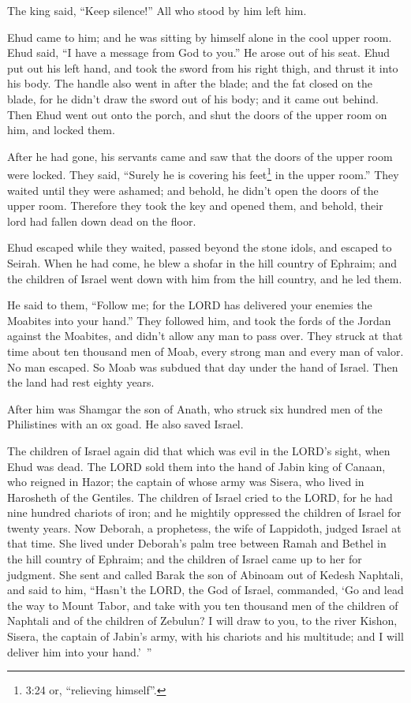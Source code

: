 The king said, “Keep silence!” All who stood by him left him.

\myverse{}Ehud came to him; and he was sitting by himself alone in the
cool upper room. Ehud said, “I have a message from God to you.” He arose out of his seat.
\myverse{}Ehud put out his left hand, and took the sword from his right thigh, and thrust
it into his body.
\myverse{}The handle also went in after the blade; and the fat closed on the blade,
for he didn’t draw the sword out of his body; and it came out behind.
\myverse{}Then Ehud went out onto the porch, and shut the doors of the upper room on
him, and locked them.

\myverse{}After he had gone, his servants came and saw that the doors of
the upper room were locked. They said, “Surely he is covering his feet\footnote{3:24 or, “relieving himself”.} in the upper room.”
\myverse{}They waited until they were ashamed; and behold, he didn’t open the doors
of the upper room. Therefore they took the key and opened them, and behold, their lord had fallen down
dead on the floor.

\myverse{}Ehud escaped while they waited, passed beyond the stone idols,
and escaped to Seirah.
\myverse{}When he had come, he blew a shofar in the hill country of Ephraim; and the
children of Israel went down with him from the hill country, and he led them.

\myverse{}He said to them, “Follow me; for the LORD has delivered your
enemies the Moabites into your hand.” They followed him, and took the fords of the Jordan against the
Moabites, and didn’t allow any man to pass over.
\myverse{}They struck at that time about ten thousand men of Moab, every strong man
and every man of valor. No man escaped.
\myverse{}So Moab was subdued that day under the hand of Israel. Then the land had rest
eighty years.

\myverse{}After him was Shamgar the son of Anath, who struck six hundred
men of the Philistines with an ox goad. He also saved Israel.


\mychapter{} \myverse*{}The children of Israel again did that which was evil in the LORD’s
sight, when Ehud was dead.
\myverse{}The LORD sold them into the hand of Jabin king of Canaan, who reigned in Hazor;
the captain of whose army was Sisera, who lived in Harosheth of the Gentiles.
\myverse{}The children of Israel cried to the LORD, for he had nine hundred chariots of
iron; and he mightily oppressed the children of Israel for twenty years.
\myverse{}Now Deborah, a prophetess, the wife of Lappidoth, judged Israel at that time.
\myverse{}She lived under Deborah’s palm tree between Ramah and Bethel in the hill country
of Ephraim; and the children of Israel came up to her for judgment.
\myverse{}She sent and called Barak the son of Abinoam out of Kedesh Naphtali, and said
to him, “Hasn’t the LORD, the God of Israel, commanded, ‘Go and lead the way to Mount Tabor, and take
with you ten thousand men of the children of Naphtali and of the children of Zebulun?
\myverse{}I will draw to you, to the river Kishon, Sisera, the captain of Jabin’s army,
with his chariots and his multitude; and I will deliver him into your hand.’ ”

